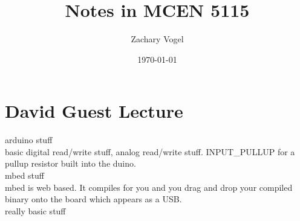 \documentclass{article}
\author{Zachary Vogel}
\date{\today}
\title{Notes in MCEN 5115}
\begin{document}
\maketitle


\section*{David Guest Lecture}
arduino stuff\\
basic digital read/write stuff, analog read/write stuff. INPUT\_PULLUP for a pullup resistor built into the duino.\\


mbed stuff\\
mbed is web based. It compiles for you and you drag and drop your compiled binary onto the board which appears as a USB.\\

really basic stuff\\
\end{document}
